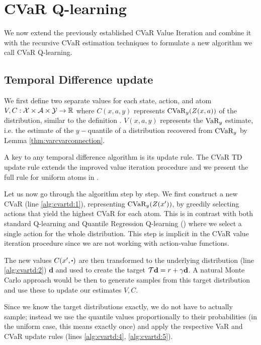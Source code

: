 \section{CVaR Q-learning}\label{sec:qcvar}

We now extend the previously established CVaR Value Iteration and combine it with the recursive CVaR estimation techniques to formulate a new algorithm we call CVaR Q-learning.

\subsection{Temporal Difference update}
We first define two separate values for each state, action, and atom $V, C: \mathcal{X}\times\mathcal{A}\times\mathcal{Y}\to\mathbb{R}$ where $C(x, a, y)$ represents $\text{CVaR}_y(Z(x, a))$ of the distribution, similar to the definition . $V(x, a, y)$ represents the $\text{VaR}_y$ estimate, i.e. the estimate of the $y-$quantile of a distribution recovered from $\text{CVaR}_y$ by Lemma \ref{thm:varcvarconnection}.

A key to any temporal difference algorithm is its update rule. The CVaR TD update rule extends the improved value iteration procedure and we present the full rule for uniform atoms in . 

Let us now go through the algorithm step by step. We first construct a new CVaR (line \ref{alg:cvartd:1}), representing $\text{CVaR}_y(Z(x'))$, by greedily selecting actions that yield the highest CVaR for each atom. This is in contrast with both standard Q-learning and Quantile Regression Q-learning () where we select a single action for the whole distribution.
This step is implicit in the CVaR value iteration procedure since we are not working with action-value functions. 

The new values $C(x', \bigcdot)$ are then transformed to the underlying distribution (line \ref{alg:cvartd:2}) $\mathbf{d}$ and used to create the target $\mathcal{T} \mathbf{d} = r + \gamma \mathbf{d}$. A natural Monte Carlo approach would be then to generate samples from this target distribution and use these to update our estimates $V, C$.

Since we know the target distributions exactly, we do not have to actually sample; instead we use the quantile values proportionally to their probabilities (in the uniform case, this means exactly once) and apply the respective VaR and CVaR update rules (lines \ref{alg:cvartd:4}, \ref{alg:cvartd:5}).


